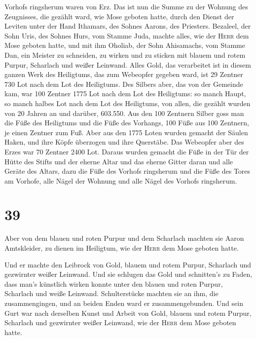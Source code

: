 Vorhofs ringsherum waren von Erz.  Das ist nun die Summe
zu der Wohnung des Zeugnisses, die gezählt ward, wie Mose geboten hatte,
durch den Dienst der Leviten unter der Hand Ithamars, des Sohnes Aarons,
des Priesters.  Bezaleel, der Sohn Uris, des Sohnes Hurs,
vom Stamme Juda, machte alles, wie der \textsc{Herr} dem Mose geboten
hatte,  und mit ihm Oholiab, der Sohn Ahisamachs, vom
Stamme Dan, ein Meister zu schneiden, zu wirken und zu sticken mit
blauem und rotem Purpur, Scharlach und weißer Leinwand. 
Alles Gold, das verarbeitet ist in diesem ganzen Werk des Heiligtums,
das zum Webeopfer gegeben ward, ist 29 Zentner 730 Lot nach dem Lot des
Heiligtums.  Des Silbers aber, das von der Gemeinde kam,
war 100 Zentner 1775 Lot nach dem Lot des Heiligtums:  so
manch Haupt, so manch halbes Lot nach dem Lot des Heiligtums, von allen,
die gezählt wurden von 20 Jahren an und darüber, 603.550.
 Aus den 100 Zentnern Silber goss man die Füße des
Heiligtums und die Füße des Vorhangs, 100 Füße aus 100 Zentnern, je
einen Zentner zum Fuß.  Aber aus den 1775 Loten wurden
gemacht der Säulen Haken, und ihre Köpfe überzogen und ihre Querstäbe.
 Das Webeopfer aber des Erzes war 70 Zentner 2400 Lot.
 Daraus wurden gemacht die Füße in der Tür der Hütte des
Stifts und der eherne Altar und das eherne Gitter daran und alle Geräte
des Altars,  dazu die Füße des Vorhofs ringsherum und die
Füße des Tores am Vorhofe, alle Nägel der Wohnung und alle Nägel des
Vorhofs ringsherum.

\hypertarget{section-38}{%
\section{39}\label{section-38}}

 Aber von dem blauen und roten Purpur und dem Scharlach
machten sie Aaron Amtskleider, zu dienen im Heiligtum, wie der
\textsc{Herr} dem Mose geboten hatte.

 Und er machte den Leibrock von Gold, blauem und rotem
Purpur, Scharlach und gezwirnter weißer Leinwand.  Und sie
schlugen das Gold und schnitten's zu Faden, dass man's künstlich wirken
konnte unter den blauen und roten Purpur, Scharlach und weiße Leinwand.
 Schulterstücke machten sie an ihm, die zusammengingen,
und an beiden Enden ward er zusammengebunden.  Und sein
Gurt war nach derselben Kunst und Arbeit von Gold, blauem und rotem
Purpur, Scharlach und gezwirnter weißer Leinwand, wie der \textsc{Herr}
dem Mose geboten hatte.

